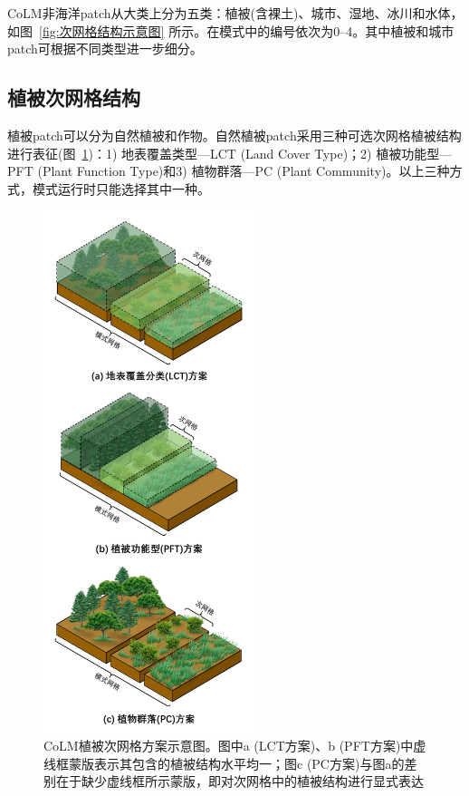 CoLM非海洋patch从大类上分为五类：植被(含裸土)、城市、湿地、冰川和水体，如图~\ref{fig:次网格结构示意图} 所示。在模式中的编号依次为0--4。其中植被和城市patch可根据不同类型进一步细分。

\subsection{植被次网格结构}\label{sec:植被次网格}
植被patch可以分为自然植被和作物。自然植被patch采用三种可选次网格植被结构进行表征(图~\ref{fig:植被次网格方案})：1) 地表覆盖类型---LCT (Land Cover Type)；2) 植被功能型---PFT (Plant Function Type)和3) 植物群落---PC (Plant Community)。以上三种方式，模式运行时只能选择其中一种。

{
  \begin{figure}[htbp]
    \centering
    \includegraphics[width=0.55\textwidth]{Figures/模式构架/植被次网格方案示意图_v4.jpg}
    \caption[CoLM植被次网格方案示意图]{CoLM植被次网格方案示意图。图中a (LCT方案)、b (PFT方案)中虚线框蒙版表示其包含的植被结构水平均一；图c (PC方案)与图a的差别在于缺少虚线框所示蒙版，即对次网格中的植被结构进行显式表达}
    \label{fig:植被次网格方案}
  \end{figure}
}

